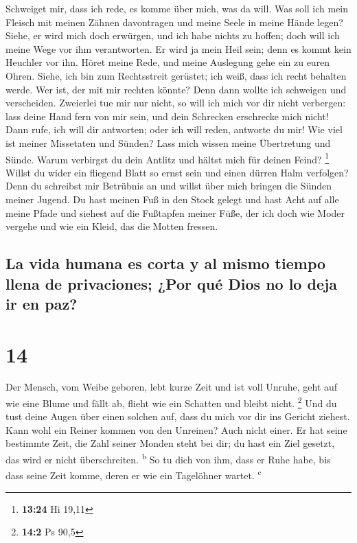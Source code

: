  Schweiget mir, dass ich rede, es komme über mich, was da
will.  Was soll ich mein Fleisch mit meinen Zähnen
davontragen und meine Seele in meine Hände legen?  Siehe,
er wird mich doch erwürgen, und ich habe nichts zu hoffen; doch will ich
meine Wege vor ihm verantworten.  Er wird ja mein Heil
sein; denn es kommt kein Heuchler vor ihn.  Höret meine
Rede, und meine Auslegung gehe ein zu euren Ohren. 
Siehe, ich bin zum Rechtsstreit gerüstet; ich weiß, dass ich recht
behalten werde.  Wer ist, der mit mir rechten könnte?
Denn dann wollte ich schweigen und verscheiden. 
Zweierlei tue mir nur nicht, so will ich mich vor dir nicht verbergen:
 lass deine Hand fern von mir sein, und dein Schrecken
erschrecke mich nicht!  Dann rufe, ich will dir
antworten; oder ich will reden, antworte du mir!  Wie
viel ist meiner Missetaten und Sünden? Lass mich wissen meine
Übertretung und Sünde.  Warum verbirgst du dein Antlitz
und hältst mich für deinen Feind? \footnote{\textbf{13:24} Hi 19,11}
 Willst du wider ein fliegend Blatt so ernst sein und
einen dürren Halm verfolgen?  Denn du schreibst mir
Betrübnis an und willst über mich bringen die Sünden meiner Jugend.
 Du hast meinen Fuß in den Stock gelegt und hast Acht auf
alle meine Pfade und siehest auf die Fußtapfen meiner Füße,
 der ich doch wie Moder vergehe und wie ein Kleid, das
die Motten fressen.

\hypertarget{la-vida-humana-es-corta-y-al-mismo-tiempo-llena-de-privaciones-por-quuxe9-dios-no-lo-deja-ir-en-paz}{%
\subsection{La vida humana es corta y al mismo tiempo llena de
privaciones; ¿Por qué Dios no lo deja ir en
paz?}\label{la-vida-humana-es-corta-y-al-mismo-tiempo-llena-de-privaciones-por-quuxe9-dios-no-lo-deja-ir-en-paz}}

\hypertarget{section-13}{%
\section{14}\label{section-13}}

 Der Mensch, vom Weibe geboren, lebt kurze Zeit und ist
voll Unruhe,  geht auf wie eine Blume und fällt ab, flieht
wie ein Schatten und bleibt nicht. \footnote{\textbf{14:2} Ps 90,5}
 Und du tust deine Augen über einen solchen auf, dass du
mich vor dir ins Gericht ziehest.  Kann wohl ein Reiner
kommen von den Unreinen? Auch nicht einer.  Er hat seine
bestimmte Zeit, die Zahl seiner Monden steht bei dir; du hast ein Ziel
gesetzt, das wird er nicht überschreiten. \textsuperscript{b}
 So tu dich von ihm, dass er Ruhe habe, bis dass seine
Zeit komme, deren er wie ein Tagelöhner wartet. \textsuperscript{c}

